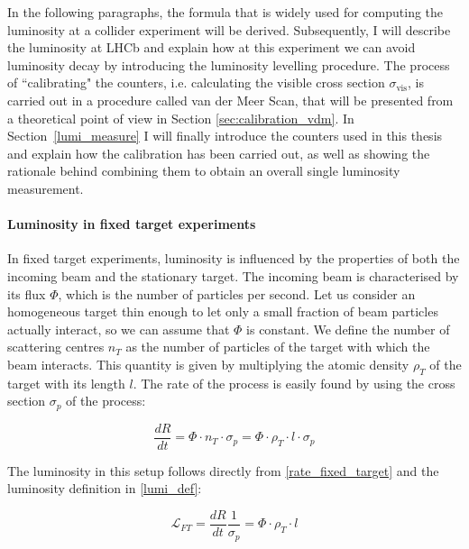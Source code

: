 In the following paragraphs, the formula that is widely used for computing the luminosity at a collider experiment will be derived.
Subsequently, I will describe the luminosity at LHCb and explain how at this experiment we can avoid luminosity decay by introducing the luminosity levelling procedure. The process of ``calibrating" the counters, i.e. calculating the visible cross section $\sigma_{\text{vis}}$, is carried out in a procedure called van der Meer Scan, that will be presented from a theoretical point of view in Section \ref{sec:calibration_vdm}. In Section~\ref{lumi_measure} I will finally introduce the counters used in this thesis and explain how the calibration has been carried out, as well as showing the rationale behind combining them to obtain an overall single luminosity measurement.

\paragraph{Luminosity in fixed target experiments}
In fixed target experiments, luminosity is influenced by the properties of both the incoming beam and the stationary target. The incoming beam is characterised by its flux $\Phi$, which is the number of particles per second. Let us consider an homogeneous target thin enough to let only a small fraction of beam particles actually
interact, so we can assume that $\Phi$ is constant. We define the number of scattering centres $n_T$ as the number of particles of the target with which the beam interacts. This quantity is given by multiplying the atomic density $\rho_T$ of the target with its length $l$.  
The rate of the process is easily found by using the cross section $\sigma_p$ of the process:

\begin{equation}
\frac{dR}{dt} =\Phi \cdot n_T \cdot \sigma_p = \Phi \cdot \rho_T \cdot l \cdot \sigma_p\label{rate_fixed_target}
\end{equation}

The luminosity in this setup follows directly from \eqref{rate_fixed_target} and the luminosity definition in \eqref{lumi_def}:

\begin{equation}
\mathcal{L}_{FT} = \frac{dR}{dt}\frac{1}{\sigma_p} = \Phi \cdot \rho_T \cdot l
\end{equation}

